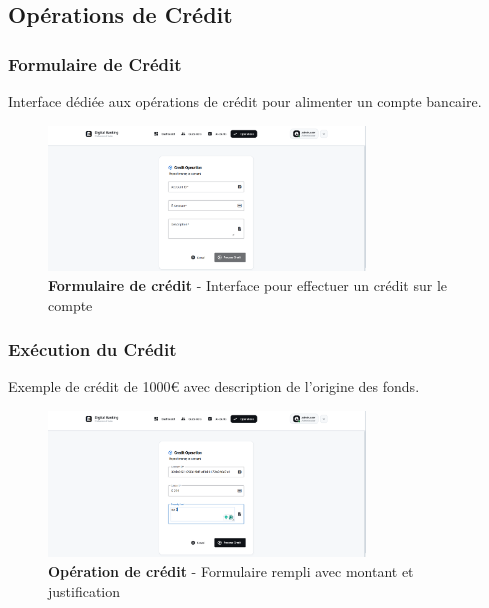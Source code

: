 \documentclass[11pt, a4paper]{article}
\begin{document}
\subsection{Opérations de Crédit}

\subsubsection{Formulaire de Crédit}

Interface dédiée aux opérations de crédit pour alimenter un compte bancaire.

\begin{figure}[H]
    \centering
    \includegraphics[width=0.75\textwidth]{screenshots/06_04_operation_credit_form_empty.png}
    \caption{\textbf{Formulaire de crédit} - Interface pour effectuer un crédit sur le compte}
    \label{fig:operation_credit_form_empty}
\end{figure}

\subsubsection{Exécution du Crédit}

Exemple de crédit de 1000€ avec description de l'origine des fonds.

\begin{figure}[H]
    \centering
    \includegraphics[width=0.75\textwidth]{screenshots/06_05_operation_credit_form_filled.png}
    \caption{\textbf{Opération de crédit} - Formulaire rempli avec montant et justification}
    \label{fig:operation_credit_form_filled}
\end{figure}
\end{document}
